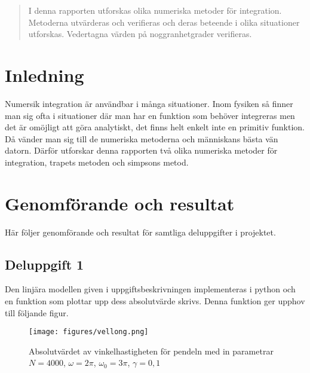 \documentclass[12pt]{article}
\begin{document}
\pagebreak
\begin{abstract}
    I denna rapporten utforskas olika numeriska metoder för integration. Metoderna utvärderas och verifieras och deras beteende i olika situationer utforskas. Vedertagna värden på noggranhetgrader verifieras.
\end{abstract}
\pagebreak
\tableofcontents
\pagebreak
\section{Inledning}

Numersik integration är användbar i många situationer. Inom fysiken så finner man sig ofta i situationer där man har en funktion som behöver integreras men det är omöjligt att göra analytiskt, det finns helt enkelt inte en primitiv funktion. Då vänder man sig till de numeriska metoderna och människans bästa vän datorn. Därför utforskar denna rapporten två olika numeriska metoder för integration, trapets metoden och simpsons metod. 

\section{Genomförande och resultat}

Här följer genomförande och resultat för samtliga deluppgifter i projektet.

\subsection{Deluppgift 1}
Den linjära modellen given i uppgiftsbeskrivningen implementeras i python och en funktion som plottar upp dess absolutvärde skrivs. Denna funktion ger upphov till följande figur.

\begin{figure}[H]
  \begin{small}
    \begin{center}
      \texttt{[image: figures/vellong.png]}
    \end{center}
    \caption{Absolutvärdet av vinkelhastigheten för pendeln med in parametrar $N = 4000$, $\omega = 2\pi$,  $\omega_0 = 3\pi$, $\gamma = 0,1$}
    \label{fig:vellong}
  \end{small}
\end{figure}
\end{document}
